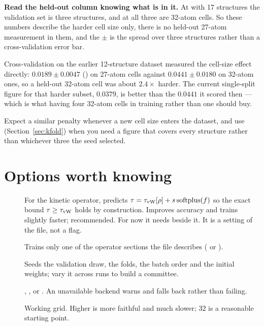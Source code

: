 \begin{pwarn}
\textbf{Read the held-out column knowing what is in it.} At
 with 17 structures the validation set is three
structures, and at  all three are 32-atom cells. So these numbers
describe the harder cell size only, there is no held-out 27-atom measurement in
them, and the $\pm$ is the spread over three structures rather than a
cross-validation error bar.

Cross-validation on the earlier 12-structure dataset measured the cell-size
effect directly: $0.0189 \pm 0.0047$ () on 27-atom cells against
$0.0441 \pm 0.0180$ on 32-atom ones, so a held-out 32-atom cell was about
$2.4\times$ harder. The current single-split figure for that harder subset,
$0.0379$, is better than the $0.0441$ it scored then --- which is what having
four 32-atom cells in training rather than one should buy.

Expect a similar penalty whenever a new cell size enters the dataset, and use
 (Section~\ref{sec:kfold}) when you need a figure that covers
every structure rather than whichever three the seed selected.
\end{pwarn}

\section{Options worth knowing}

\begin{description}
  \item[] For the kinetic operator, predicts
    $\tau = \tau_{\rm vW}[\rho] + s\,\mathrm{softplus}(f)$ so the exact bound
    $\tau \ge \tau_{\rm vW}$ holds by construction. Improves accuracy and
    trains slightly faster; recommended. For now it needs
     beside it. It is a setting of the file, not a flag.
  \item[] Trains only one of the operator sections the file
    describes ( or ).
  \item[] Seeds the validation draw, the folds, the batch order
    and the initial weights; vary it across runs to build a committee.
  \item[] , ,  or . An
    unavailable backend warns and falls back rather than failing.
  \item[] Working grid. Higher is more faithful and much
    slower; $32$ is a reasonable starting point.
\end{description}
